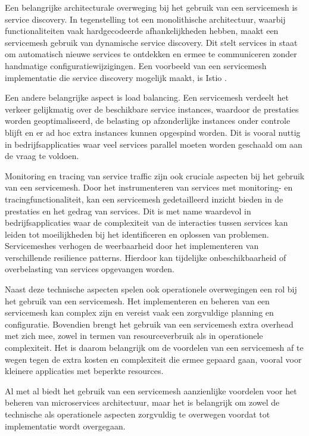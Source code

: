 Een belangrijke architecturale overweging bij het gebruik van een servicemesh is service discovery. In tegenstelling tot een monolithische architectuur, waarbij functionaliteiten vaak hardgecodeerde afhankelijkheden hebben, maakt een servicemesh gebruik van dynamische service discovery. Dit stelt services in staat om automatisch nieuwe services te ontdekken en ermee te communiceren zonder handmatige configuratiewijzigingen. Een voorbeeld van een servicemesh implementatie die service discovery mogelijk maakt, is Istio
 \autocite{Morgan2021}.

Een andere belangrijke aspect is load balancing. Een servicemesh verdeelt het verkeer gelijkmatig over de beschikbare service instances, waardoor de prestaties worden geoptimaliseerd, de belasting op afzonderlijke instances onder controle blijft en er ad hoc extra instances kunnen opgespind worden. Dit is vooral nuttig in bedrijfsapplicaties waar veel services parallel moeten worden geschaald om aan de vraag te voldoen\autocite{Ciobotaru2020}.

Monitoring en tracing van service traffic zijn ook cruciale aspecten bij het gebruik van een servicemesh. Door het instrumenteren van services met monitoring- en tracingfunctionaliteit, kan een servicemesh gedetailleerd inzicht bieden in de prestaties en het gedrag van services. Dit is met name waardevol in bedrijfsapplicaties waar de complexiteit van de interacties tussen services kan leiden tot moeilijkheden bij het identificeren en oplossen van problemen. Servicemeshes verhogen de weerbaarheid door het implementeren van verschillende resilience patterns. Hierdoor kan tijdelijke onbeschikbaarheid of overbelasting van services opgevangen worden\autocite{Ciobotaru2021}.

Naast deze technische aspecten spelen ook operationele overwegingen een rol bij het gebruik van een servicemesh. Het implementeren en beheren van een servicemesh kan complex zijn en vereist vaak een zorgvuldige planning en configuratie. Bovendien brengt het gebruik van een servicemesh extra overhead met zich mee, zowel in termen van resourceverbruik als in operationele complexiteit. Het is daarom belangrijk om de voordelen van een servicemesh af te wegen tegen de extra kosten en complexiteit die ermee gepaard gaan, vooral voor kleinere applicaties met beperkte resources.


Al met al biedt het gebruik van een servicemesh aanzienlijke voordelen voor het beheren van microservices architectuur, maar het is belangrijk om zowel de technische als operationele aspecten zorgvuldig te overwegen voordat tot implementatie wordt overgegaan.


